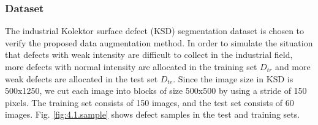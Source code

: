 \documentclass[sn-mathphys]{sn-jnl}%
\theoremstyle{thmstyleone}%
\theoremstyle{thmstyletwo}%
\theoremstyle{thmstylethree}%
\begin{document}
\subsubsection{Dataset}\label{sec:exp.1.1}
The industrial Kolektor surface defect (KSD) segmentation dataset \cite{tabernik2020segmentation} is chosen to verify the proposed data augmentation method. In order to simulate the situation that defects with weak intensity are difficult to collect in the industrial field, more defects with normal intensity are allocated in the training set $D_{tr}$ and more weak defects are allocated in the test set $D_{te}$. Since the image size in KSD is 500x1250, we cut each image into blocks of size 500x500 by using a stride of 150 pixels. The training set consists of 150 images, and the test set consists of 60 images. Fig. \ref{fig:4.1.sample} shows defect samples in the test and training sets.
\end{document}
